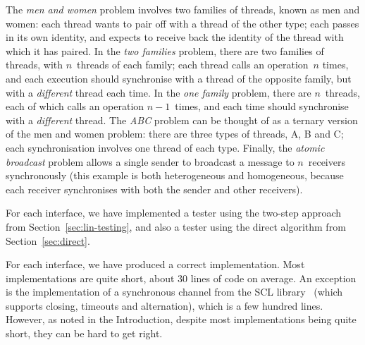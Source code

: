 

%
The \emph{men and women} problem involves two families of threads, known as
men and women: each thread wants to pair off with a thread of the other type;
each passes in its own identity, and expects to receive back the identity of
the thread with which it has paired.  
%
In the \emph{two families} problem, there are two families of threads, with
$n$~threads of each family; each thread calls an operation~$n$ times, and each
execution should synchronise with a thread of the opposite family, but with a
\emph{different} thread each time.  In the \emph{one family} problem, there
are $n$~threads, each of which calls an operation $n-1$~times, and each time
should synchronise with a \emph{different} thread.
%
The \emph{ABC} problem can be thought of as a ternary version of the
men and women problem: there are three types of threads, A, B and C; each
synchronisation involves one thread of each type.
%
%
Finally, the \emph{atomic broadcast} problem allows a single sender to
broadcast a message to $n$~receivers synchronously (this example is both
heterogeneous and homogeneous, because each receiver synchronises with both
the sender and other receivers).

For each interface, we have implemented a tester using the two-step approach
from Section~\ref{sec:lin-testing}, and also a tester using the direct
algorithm from Section~\ref{sec:direct}.

For each interface, we have produced a correct implementation.  Most
implementations are quite short, about 30 lines of code on average.  An
exception is the implementation of a synchronous channel from the SCL
library~\cite{gavin:SCL-CSP} (which supports closing, timeouts and
alternation), which is a few hundred lines.  However, as noted in the
Introduction, despite most implementations being quite short, they can be hard
to get right.

